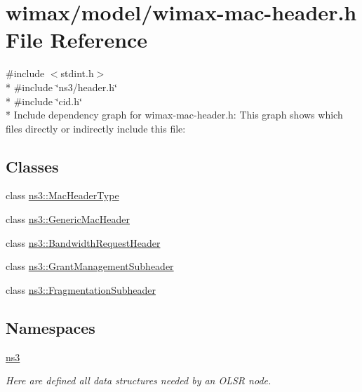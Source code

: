 \hypertarget{wimax-mac-header_8h}{}\section{wimax/model/wimax-\/mac-\/header.h File Reference}
\label{wimax-mac-header_8h}
{\ttfamily \#include $<$stdint.\+h$>$}\\*
{\ttfamily \#include \char`\"{}ns3/header.\+h\char`\"{}}\\*
{\ttfamily \#include \char`\"{}cid.\+h\char`\"{}}\\*
Include dependency graph for wimax-\/mac-\/header.h\+:
This graph shows which files directly or indirectly include this file\+:
\subsection*{Classes}
\begin{DoxyCompactItemize}
\item 
class \hyperlink{classns3_1_1MacHeaderType}{ns3\+::\+Mac\+Header\+Type}
\item 
class \hyperlink{classns3_1_1GenericMacHeader}{ns3\+::\+Generic\+Mac\+Header}
\item 
class \hyperlink{classns3_1_1BandwidthRequestHeader}{ns3\+::\+Bandwidth\+Request\+Header}
\item 
class \hyperlink{classns3_1_1GrantManagementSubheader}{ns3\+::\+Grant\+Management\+Subheader}
\item 
class \hyperlink{classns3_1_1FragmentationSubheader}{ns3\+::\+Fragmentation\+Subheader}
\end{DoxyCompactItemize}
\subsection*{Namespaces}
\begin{DoxyCompactItemize}
\item 
 \hyperlink{namespacens3}{ns3}
\begin{DoxyCompactList}\small\item\em Here are defined all data structures needed by an O\+L\+SR node. \end{DoxyCompactList}\end{DoxyCompactItemize}
